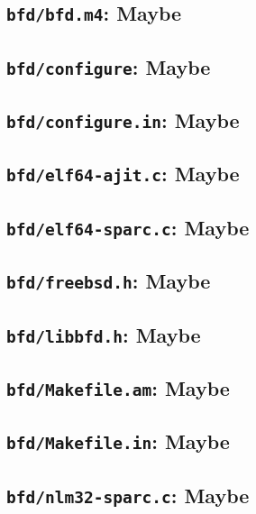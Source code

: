 \subsection{\texttt{bfd/bfd.m4}: Maybe}
\label{sec:bfd:bfd.m4}


\subsection{\texttt{bfd/configure}: Maybe}
\label{sec:bfd:configure}


\subsection{\texttt{bfd/configure.in}: Maybe}
\label{sec:bfd:configure.in}


\subsection{\texttt{bfd/elf64-ajit.c}: Maybe}
\label{sec:bfd:elf64-ajit.c}


\subsection{\texttt{bfd/elf64-sparc.c}: Maybe}
\label{sec:bfd:elf64-sparc.c}


\subsection{\texttt{bfd/freebsd.h}: Maybe}
\label{sec:bfd:freebsd.h}


\subsection{\texttt{bfd/libbfd.h}: Maybe}
\label{sec:bfd:libbfd.h}


\subsection{\texttt{bfd/Makefile.am}: Maybe}
\label{sec:bfd:Makefile.am}


\subsection{\texttt{bfd/Makefile.in}: Maybe}
\label{sec:bfd:Makefile.in}


\subsection{\texttt{bfd/nlm32-sparc.c}: Maybe}
\label{sec:bfd:nlm32-sparc.c}


